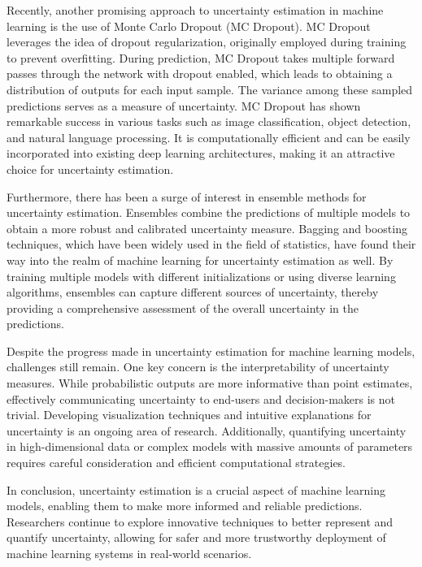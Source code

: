 Recently, another promising approach to uncertainty estimation in machine learning is the use of Monte Carlo Dropout (MC Dropout). MC Dropout leverages the idea of dropout regularization, originally employed during training to prevent overfitting. During prediction, MC Dropout takes multiple forward passes through the network with dropout enabled, which leads to obtaining a distribution of outputs for each input sample. The variance among these sampled predictions serves as a measure of uncertainty. MC Dropout has shown remarkable success in various tasks such as image classification, object detection, and natural language processing. It is computationally efficient and can be easily incorporated into existing deep learning architectures, making it an attractive choice for uncertainty estimation.

Furthermore, there has been a surge of interest in ensemble methods for uncertainty estimation. Ensembles combine the predictions of multiple models to obtain a more robust and calibrated uncertainty measure. Bagging and boosting techniques, which have been widely used in the field of statistics, have found their way into the realm of machine learning for uncertainty estimation as well. By training multiple models with different initializations or using diverse learning algorithms, ensembles can capture different sources of uncertainty, thereby providing a comprehensive assessment of the overall uncertainty in the predictions.

Despite the progress made in uncertainty estimation for machine learning models, challenges still remain. One key concern is the interpretability of uncertainty measures. While probabilistic outputs are more informative than point estimates, effectively communicating uncertainty to end-users and decision-makers is not trivial. Developing visualization techniques and intuitive explanations for uncertainty is an ongoing area of research. Additionally, quantifying uncertainty in high-dimensional data or complex models with massive amounts of parameters requires careful consideration and efficient computational strategies.

In conclusion, uncertainty estimation is a crucial aspect of machine learning models, enabling them to make more informed and reliable predictions. Researchers continue to explore innovative techniques to better represent and quantify uncertainty, allowing for safer and more trustworthy deployment of machine learning systems in real-world scenarios.





